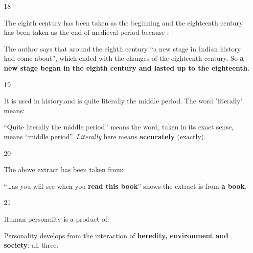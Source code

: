 \begin{question}{18}
{The eighth century has been taken as the beginning and the eighteenth century has been taken as the end of medieval period because :\par}
\begin{explain}
The author says that around the eighth century ``a new stage in Indian history had come about'', which ended with the changes of the eighteenth century. So \textbf{a new stage began in the eighth century and lasted up to the eighteenth}.
\end{explain}
\end{question}

\begin{question}{19}
{It is used in history.and is quite literally the middle period. The word 'literally' means:\par}
\begin{explain}
``Quite literally the middle period'' means the word, taken in its exact sense, means ``middle period''. \emph{Literally} here means \textbf{accurately} (exactly).
\end{explain}
\end{question}

\begin{question}{20}
{The above extract has been taken from:\par}
\begin{explain}
``\ldots as you will see when you \textbf{read this book}'' shows the extract is from \textbf{a book}.
\end{explain}
\end{question}

\begin{question}{21}
{Human personality is a product of:\par}
\begin{explain}
Personality develops from the interaction of \textbf{heredity, environment and society}: all three.
\end{explain}
\end{question}

